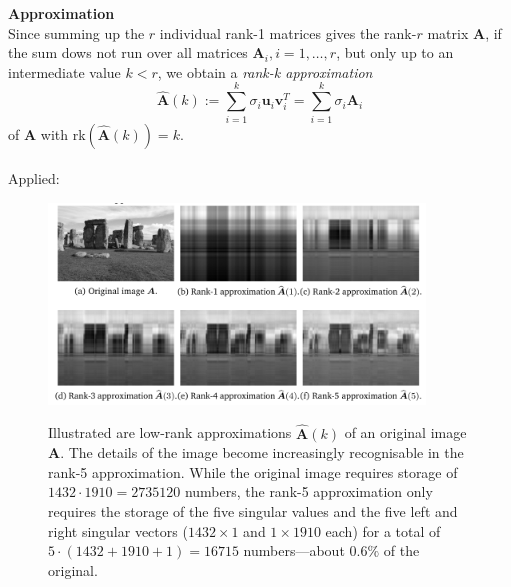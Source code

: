 \documentclass{report}
\begin{document}
\newpage
\noindent\textbf{Approximation}\\
Since summing up the $r$ individual rank-1 matrices gives the rank-$r$ matrix $\bm{A}$, 
if the sum dows not run over all matrices $\bm{A}_i,i=1,\ldots,r$, but only up to an intermediate value $k<r$, 
we obtain a \textit{rank-k approximation}
\begin{equation*}
\widehat{\bm{A}}(k):=\sum^k_{i=1}\sigma_i\bm{u}_i\bm{v}_i^T=\sum^k_{i=1}\sigma_i\bm{A}_i
\end{equation*}
of $\bm{A}$ with rk$(\widehat{\bm{A}}(k))=k$.\\
\vspace{1mm}\\
Applied:
\begin{figure}[h]
\begin{center}
\includegraphics[width=10cm]{25}\\
\end{center}
Illustrated are low-rank approximations $\widehat{\bm{A}}(k)$ of an original image $\bm{A}$. The details of
the image become increasingly recognisable in the rank-5
approximation. While the original image requires storage of $1432\cdot1910=2735120$ numbers, the rank-5
approximation only requires the storage of the five singular values and the five left and right singular vectors
($1432\times1$ and $1\times1910$ each) for a total of 
$5\cdot(1432+1910+1)=16715$ numbers---about $0.6\%$ of the original.
\end{figure}
\newpage
\end{document}
